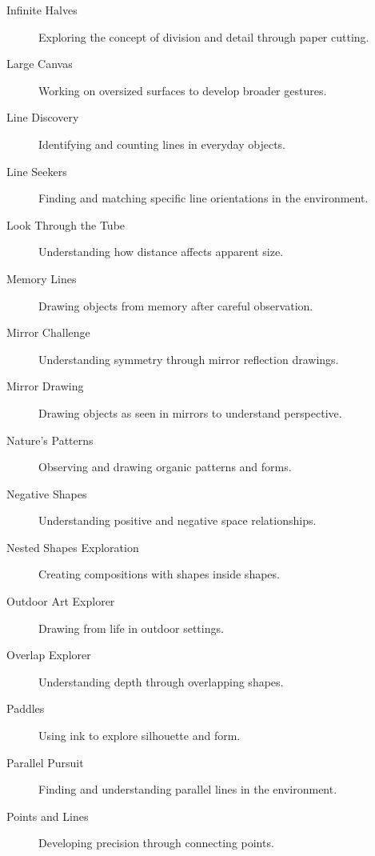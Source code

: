 \documentclass{article}
\begin{document}
\begin{description}
    \item[Infinite Halves] Exploring the concept of division and detail through paper cutting.
    
    \item[Large Canvas] Working on oversized surfaces to develop broader gestures.
    
    \item[Line Discovery] Identifying and counting lines in everyday objects.
    
    \item[Line Seekers] Finding and matching specific line orientations in the environment.
    
    \item[Look Through the Tube] Understanding how distance affects apparent size.
    
    \item[Memory Lines] Drawing objects from memory after careful observation.
    
    \item[Mirror Challenge] Understanding symmetry through mirror reflection drawings.
    
    \item[Mirror Drawing] Drawing objects as seen in mirrors to understand perspective.
    
    \item[Nature's Patterns] Observing and drawing organic patterns and forms.
    
    \item[Negative Shapes] Understanding positive and negative space relationships.
    
    \item[Nested Shapes Exploration] Creating compositions with shapes inside shapes.

    \item[Outdoor Art Explorer] Drawing from life in outdoor settings.
    
    \item[Overlap Explorer] Understanding depth through overlapping shapes.

    \item[Paddles] Using ink to explore silhouette and form.
    
    \item[Parallel Pursuit] Finding and understanding parallel lines in the environment.
    
    \item[Points and Lines] Developing precision through connecting points.
    

\end{description}
\end{document}

